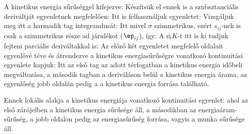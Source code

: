     A kinetikus energia sűrűséggel kifejezve:
    Készítsük el ennek is a szubsztanciális deriváltját  egyenletnek megfelelően:
    Itt is felhasználjuk  egyenletet:
    Vizsgáljuk meg itt a harmadik tag integrandusát: 
    Itt mivel $\sigma$ szimmetrikus, ezért $s_{ij}$-nek is csak a szimmetrikus része ad járulékot ($\ep_{ij}$), így:
    A $\dd_tK$-t itt is ki tudjuk fejteni parciális deriváltakkal is:
    Az előző két egyenletet megfelelő oldalait egyenlővé téve és átrendezve a kinetikus energiasűrűségre vonatkozó kontinuitási egyenlete kapjuk:
    Itt az első tag az adott térfogatban a kinetikus energia időbeli megváltozása, a második tagban a deriváláson belül a kinetikus energia árama, az egyenlőség jobb oldalán pedig a a kinetikus energia forrása található. 
    
    Ennek lokális alakja a kinetikus energiája vonatkozó kontinuitási egyenlet:
    ahol az első zárójelben a kinetikus energia sűrűsége áll, a másodikban az energiaáram-sűrűség, a jobb oldalon pedig az energiasűrűség forrása, vagyis a munka sűrűsége áll. 


